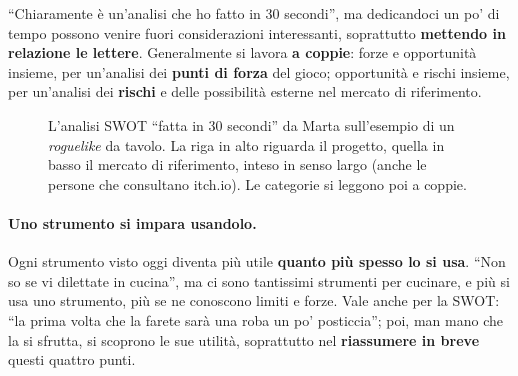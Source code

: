 ``Chiaramente è un'analisi che ho fatto in 30 secondi'', ma dedicandoci un po' di tempo
possono venire fuori considerazioni interessanti, soprattutto \textbf{mettendo in relazione
le lettere}. Generalmente si lavora \textbf{a coppie}: forze e opportunità insieme, per
un'analisi dei \textbf{punti di forza} del gioco; opportunità e rischi insieme, per
un'analisi dei \textbf{rischi} e delle possibilità esterne nel mercato di riferimento.

\begin{figure}[htbp]
\centering
{}
\caption{L'analisi SWOT ``fatta in 30 secondi'' da Marta sull'esempio di un
\emph{roguelike} da tavolo. La riga in alto riguarda il progetto, quella in basso il mercato
di riferimento, inteso in senso largo (anche le persone che consultano itch.io). Le
categorie si leggono poi a coppie.}
\label{a14:fig:swot}
\end{figure}

\paragraph{Uno strumento si impara usandolo.} Ogni strumento visto oggi diventa più utile
\textbf{quanto più spesso lo si usa}. ``Non so se vi dilettate in cucina'', ma ci sono
tantissimi strumenti per cucinare, e più si usa uno strumento, più se ne conoscono limiti e
forze. Vale anche per la SWOT: ``la prima volta che la farete sarà una roba un po'
posticcia''; poi, man mano che la si sfrutta, si scoprono le sue utilità, soprattutto nel
\textbf{riassumere in breve} questi quattro punti.

